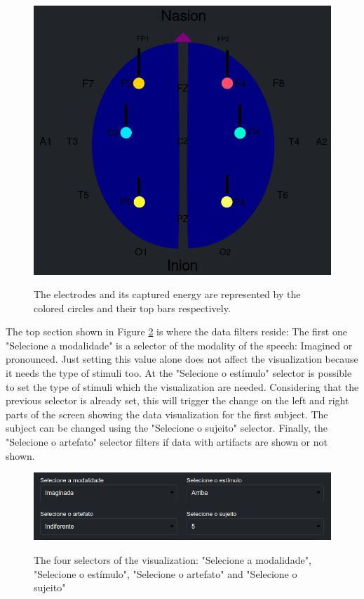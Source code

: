 \documentclass[format=sigconf]{acmart}
\begin{document}
			\begin{figure}[h]
				\centering
				\caption{The electrodes and its captured energy are represented by the colored circles and their top bars respectively.}
				\includegraphics[width=\linewidth]{images/screenshotLeft}
				\label{fig:screenshotleft}
			\end{figure}
		
			\par The top section shown in Figure \ref{fig:screenshottop} is where the data filters reside: The first one "Selecione a modalidade" is a selector of the modality of the speech: Imagined or pronounced. Just setting this value alone does not affect the visualization because it needs the type of stimuli too. At the "Selecione o estímulo" selector is possible to set the type of stimuli which the visualization are needed. Considering that the previous selector is already set, this will trigger the change on the left and right parts of the screen showing the data visualization for the first subject. The subject can be changed using the "Selecione o sujeito" selector. Finally, the "Selecione o artefato" selector filters if data with artifacts are shown or not shown.
			
			\begin{figure}[h]
				\centering
				\caption{The four selectors of the visualization: "Selecione a modalidade", "Selecione o estímulo", "Selecione o artefato" and "Selecione o sujeito"}
				\includegraphics[width=\linewidth]{images/screenshotTop}
				\label{fig:screenshottop}
			\end{figure}
		
\end{document}
